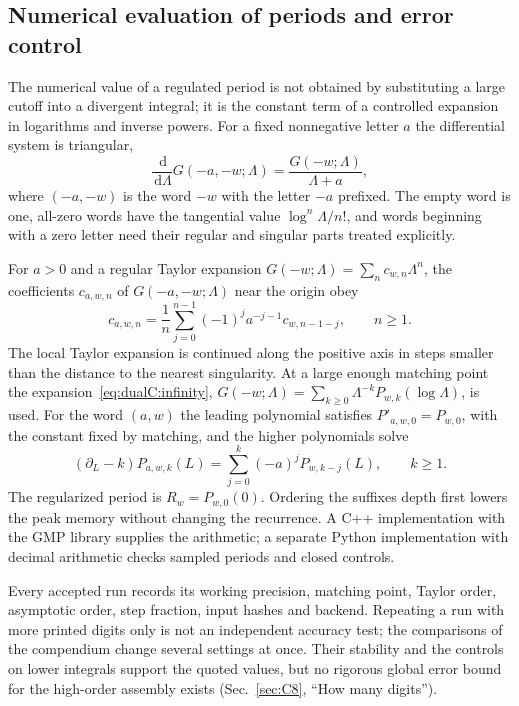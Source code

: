\documentclass[11pt,a4paper]{article}
\numberwithin{equation}{section}
\newcommand{\dd}{\,\mathrm d}
\begin{document}
\subsection{Numerical evaluation of periods and error control}\label{app:dualC:numerics}
The numerical value of a regulated period is not obtained by substituting a large cutoff into a divergent integral; it
is the constant term of a controlled expansion in logarithms and inverse powers. For a fixed nonnegative letter $a$
the differential system is triangular,
\begin{equation}
 \frac{\dd}{\dd\Lambda}G(-a,-w;\Lambda)=\frac{G(-w;\Lambda)}{\Lambda+a},
\end{equation}
where $(-a,-w)$ is the word $-w$ with the letter $-a$ prefixed. The empty word is one, all-zero words have the tangential value
$\log^n\Lambda/n!$, and words beginning with a zero letter need their regular and singular parts treated explicitly.

For $a>0$ and a regular Taylor expansion $G(-w;\Lambda)=\sum_nc_{w,n}\Lambda^n$, the coefficients $c_{a,w,n}$ of $G(-a,-w;\Lambda)$ near the origin obey
\begin{equation}
 c_{a,w,n}=\frac1n\sum_{j=0}^{n-1}(-1)^ja^{-j-1}c_{w,n-1-j},\qquad n\ge1.
\end{equation}
The local Taylor expansion is continued along the positive axis in steps smaller than the distance to the nearest
singularity. At a large enough matching point the expansion~\eqref{eq:dualC:infinity},
$G(-w;\Lambda)=\sum_{k\ge0}\Lambda^{-k}P_{w,k}(\log\Lambda)$, is used. For the word $(a,w)$ the leading polynomial satisfies
$P'_{a,w,0}=P_{w,0}$, with the constant fixed by matching, and the higher polynomials solve
\begin{equation}
 (\partial_L-k)P_{a,w,k}(L)=\sum_{j=0}^k(-a)^jP_{w,k-j}(L),\qquad k\ge1.
\end{equation}
The regularized period is $R_w=P_{w,0}(0)$. Ordering the suffixes depth first lowers the peak memory without changing
the recurrence. A C++ implementation with the GMP library supplies the arithmetic; a separate Python implementation with
decimal arithmetic checks sampled periods and closed controls.

Every accepted run records its working precision, matching point, Taylor order, asymptotic order, step fraction,
input hashes and backend. Repeating a run with more printed digits only is not an independent accuracy test; the
comparisons of the compendium change several settings at once. Their stability and the controls on lower integrals
support the quoted values, but no rigorous global error bound for the high-order assembly exists (Sec.~\ref{sec:C8},
``How many digits'').
\end{document}
